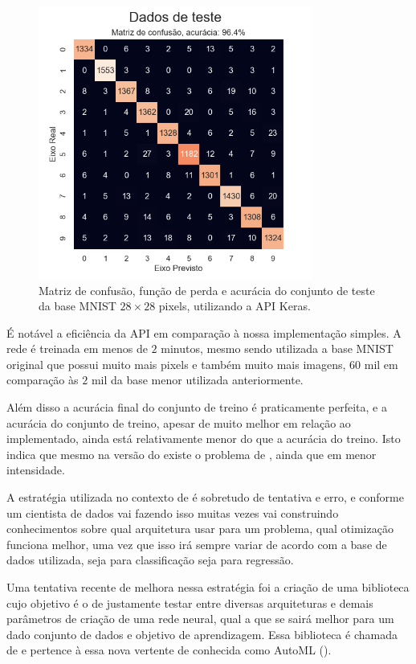 \begin{figure}[htb]
\centering
\includegraphics[width=9cm]{figuras/keras_test_2}
\caption{Matriz de confusão, função de perda e acurácia do conjunto de teste da base MNIST ${28\times28}$ pixels, utilizando a API Keras.}
\label{fig:keras_test_2}
\end{figure}

É notável a eficiência da API em comparação à nossa implementação simples. A rede é treinada em menos de $2$ minutos, mesmo sendo utilizada a base MNIST original que possui muito mais pixels e também muito mais imagens, $60$ mil em comparação às $2$ mil da base menor utilizada anteriormente. 

Além disso a acurácia final do conjunto de treino é praticamente perfeita, e a acurácia do conjunto de treino, apesar de muito melhor em relação ao  implementado, ainda está relativamente menor do que a acurácia do treino. Isto indica que mesmo na versão  do  existe o problema de , ainda que em menor intensidade.

A estratégia utilizada no contexto de  é sobretudo de tentativa e erro, e conforme um cientista de dados vai fazendo isso muitas vezes vai construindo conhecimentos sobre qual arquitetura usar para um problema, qual otimização funciona melhor, uma vez que isso irá sempre variar de acordo com a base de dados utilizada, seja para classificação seja para regressão.

Uma tentativa recente de melhora nessa estratégia foi a criação de uma biblioteca cujo objetivo é o de justamente testar entre diversas arquiteturas e demais parâmetros de criação de uma rede neural, qual a que se sairá melhor para um dado conjunto de dados e objetivo de aprendizagem. Essa biblioteca é chamada de  e pertence à essa nova vertente de  conhecida como AutoML ().

